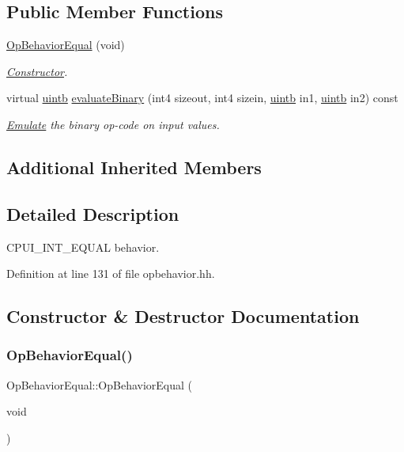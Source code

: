 \subsection*{Public Member Functions}
\begin{DoxyCompactItemize}
\item 
\mbox{\hyperlink{class_op_behavior_equal_a81ee4542013020a761330c7692f23493}{Op\+Behavior\+Equal}} (void)
\begin{DoxyCompactList}\small\item\em \mbox{\hyperlink{class_constructor}{Constructor}}. \end{DoxyCompactList}\item 
virtual \mbox{\hyperlink{types_8h_a2db313c5d32a12b01d26ac9b3bca178f}{uintb}} \mbox{\hyperlink{class_op_behavior_equal_adf2f8d7ef767536b5298f24191b5aae0}{evaluate\+Binary}} (int4 sizeout, int4 sizein, \mbox{\hyperlink{types_8h_a2db313c5d32a12b01d26ac9b3bca178f}{uintb}} in1, \mbox{\hyperlink{types_8h_a2db313c5d32a12b01d26ac9b3bca178f}{uintb}} in2) const
\begin{DoxyCompactList}\small\item\em \mbox{\hyperlink{class_emulate}{Emulate}} the binary op-\/code on input values. \end{DoxyCompactList}\end{DoxyCompactItemize}
\subsection*{Additional Inherited Members}


\subsection{Detailed Description}
C\+P\+U\+I\+\_\+\+I\+N\+T\+\_\+\+E\+Q\+U\+AL behavior. 

Definition at line 131 of file opbehavior.\+hh.



\subsection{Constructor \& Destructor Documentation}
\mbox{\label{class_op_behavior_equal_a81ee4542013020a761330c7692f23493}} 
\subsubsection{\texorpdfstring{OpBehaviorEqual()}{OpBehaviorEqual()}}
{\footnotesize\ttfamily Op\+Behavior\+Equal\+::\+Op\+Behavior\+Equal (\begin{DoxyParamCaption}\item[{void}]{ }\end{DoxyParamCaption})\hspace{0.3cm}{\ttfamily [inline]}}




